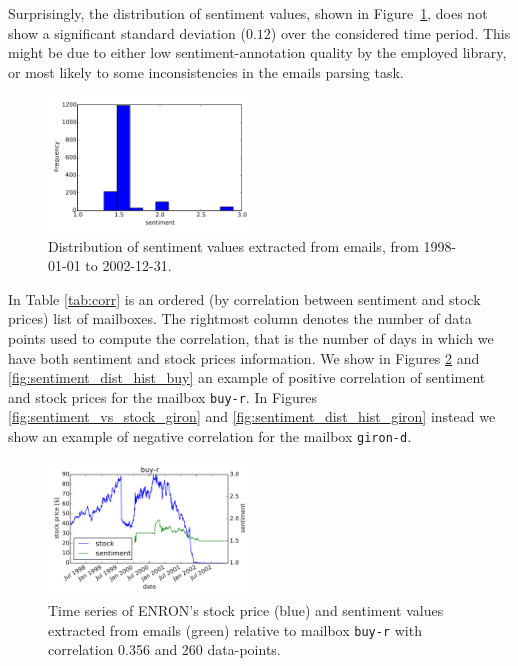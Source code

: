 \documentclass{vldb}
\begin{document}
Surprisingly, the distribution of sentiment values, shown in Figure~\ref{fig:sentiment_dist_hist}, does not show a significant standard deviation ($0.12$) over the considered time period.
This might be due to either low sentiment-annotation quality by the employed library, or most likely to some inconsistencies in the emails parsing task.

\begin{figure}[h!]
\centering
\includegraphics[width=0.48\textwidth]{imgs/sentiment_vs_stock_overall_hist.pdf}
\caption{Distribution of sentiment values extracted from emails, from 1998-01-01 to 2002-12-31.}
\label{fig:sentiment_dist_hist}
\end{figure}

In Table \ref{tab:corr} is an ordered (by correlation between sentiment and
stock prices) list of mailboxes. The rightmost column denotes the number of
data points used to compute the correlation, that is the number of days in which
we have both sentiment and stock prices information.
We show in Figures \ref{fig:sentiment_vs_stock_buy} and
\ref{fig:sentiment_dist_hist_buy} an example of positive correlation of
sentiment and stock prices for the mailbox \texttt{buy-r}. In Figures
\ref{fig:sentiment_vs_stock_giron} and \ref{fig:sentiment_dist_hist_giron}
instead we show an example of negative correlation for the mailbox
\texttt{giron-d}.

\begin{figure}[h!]
\centering
\includegraphics[width=0.48\textwidth]{imgs/sentiment_vs_stock_buy-r.pdf}
\caption{Time series of ENRON's stock price (blue) and sentiment values
	extracted from emails (green) relative to mailbox \texttt{buy-r} with
correlation 0.356 and 260 data-points.}
\label{fig:sentiment_vs_stock_buy}
\end{figure}
\end{document}
